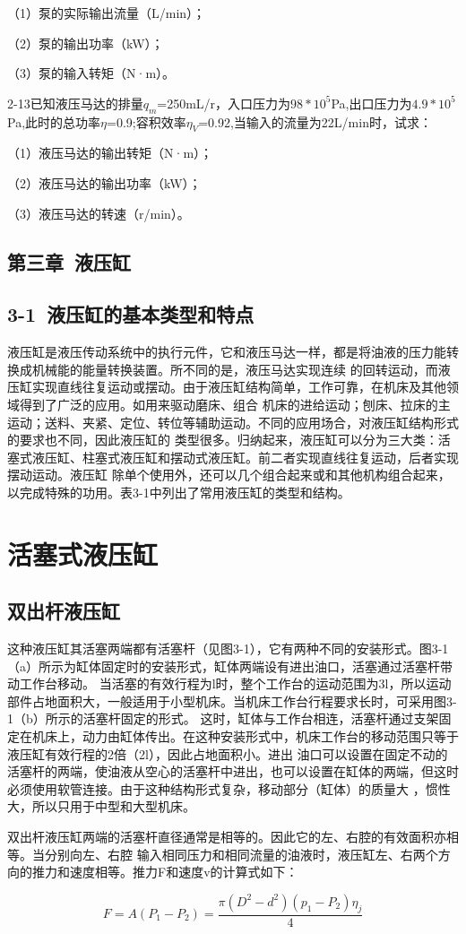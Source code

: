 \newif\ifOpenSource
\OpenSourcetrue



（1）泵的实际输出流量（L/min）；

（2）泵的输出功率（kW）；

（3）泵的输入转矩（N·m）。

2-13已知液压马达的排量$q_m$=250mL/r，入口压力为$98*10^5$Pa,出口压力为$4.9*10^5$Pa,此时的总功率$\eta$=0.9;容积效率$\eta_V$=0.92,当输入的流量为22L/min时，试求：

（1）液压马达的输出转矩（N·m）；

（2）液压马达的输出功率（kW）；

（3）液压马达的转速（r/min）。

\newpage

\begin{center}
\section{第三章\  液压缸}


\subsection{3-1\  液压缸的基本类型和特点}
\end{center}

液压缸是液压传动系统中的执行元件，它和液压马达一样，都是将油液的压力能转换成机械能的能量转换装置。所不同的是，液压马达实现连续
的回转运动，而液压缸实现直线往复运动或摆动。由于液压缸结构简单，工作可靠，在机床及其他领域得到了广泛的应用。如用来驱动磨床、组合
机床的进给运动；刨床、拉床的主运动；送料、夹紧、定位、转位等辅助运动。不同的应用场合，对液压缸结构形式的要求也不同，因此液压缸的
类型很多。归纳起来，液压缸可以分为三大类：活塞式液压缸、柱塞式液压缸和摆动式液压缸。前二者实现直线往复运动，后者实现摆动运动。液压缸
除单个使用外，还可以几个组合起来或和其他机构组合起来，以完成特殊的功用。表3-1中列出了常用液压缸的类型和结构。

\newpage

\section{活塞式液压缸}
\subsection{双出杆液压缸}

这种液压缸其活塞两端都有活塞杆（见图3-1），它有两种不同的安装形式。图3-1（a）所示为缸体固定时的安装形式，缸体两端设有进出油口，活塞通过活塞杆带动工作台移动。
当活塞的有效行程为l时，整个工作台的运动范围为3l，所以运动部件占地面积大，一般适用于小型机床。当机床工作台行程要求长时，可采用图3-1（b）所示的活塞杆固定的形式。
这时，缸体与工作台相连，活塞杆通过支架固定在机床上，动力由缸体传出。在这种安装形式中，机床工作台的移动范围只等于液压缸有效行程的2倍（2l），因此占地面积小。进出
油口可以设置在固定不动的活塞杆的两端，使油液从空心的活塞杆中进出，也可以设置在缸体的两端，但这时必须使用软管连接。由于这种结构形式复杂，移动部分（缸体）的质量大
，惯性大，所以只用于中型和大型机床。

双出杆液压缸两端的活塞杆直径通常是相等的。因此它的左、右腔的有效面积亦相等。当分别向左、右腔
输入相同压力和相同流量的油液时，液压缸左、右两个方向的推力和速度相等。推力F和速度v的计算式如下：

\begin{equation}
F=A(P_1-P_2)=\frac{\pi(D^2-d^2)(p_1-P_2)\eta_j}{4}
\end{equation}


